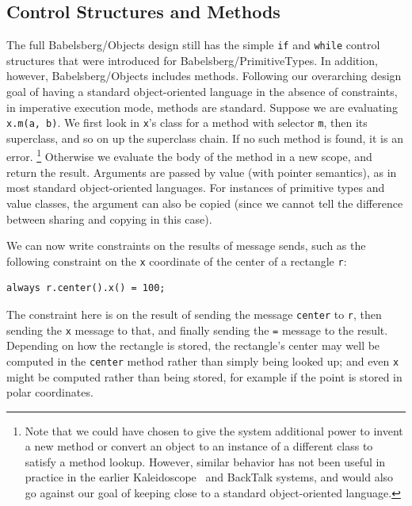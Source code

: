 \subsection{Control Structures and Methods}
\label{sec:contr-struct-meth}
The full Babelsberg/Objects design still has the simple \verb|if| and
\verb|while| control structures that were introduced for
Babelsberg/PrimitiveTypes. In addition, however, Babelsberg/Objects
includes methods. Following our overarching design goal of having a
standard object-oriented language in the absence of constraints, in
imperative execution mode, methods are standard.  Suppose we are
evaluating \verb|x.m(a, b)|.  We first look in \verb|x|'s class for a
method with selector \verb|m|, then its superclass, and so on up the
superclass chain. If no such method is found, it is an
error. \footnote{Note that we could have chosen to give the system
  additional power to invent a new method or convert an object to an
  instance of a different class to satisfy a method lookup. However,
  similar behavior has not been useful in practice in the earlier
  Kaleidoscope~\cite{freeman-benson-oopsla-1990} and BackTalk
 \cite{pachet1995} systems, and would also go against our goal of
  keeping close to a standard object-oriented language.} Otherwise we
evaluate the body of the method in a new scope, and return the result.
Arguments are passed by value (with pointer semantics), as in most
standard object-oriented languages.  For instances of primitive types
and value classes, the argument can also be copied (since we cannot
tell the difference between sharing and copying in this case).

We can now write constraints on the results of message sends, such as
the following constraint on the \verb!x! coordinate of the center of a
rectangle \verb!r!:
\begin{lstlisting}
always r.center().x() = 100;
\end{lstlisting}

The constraint here is on the result of sending the message
\verb|center| to \verb|r|, then sending the \verb|x| message to that,
and finally sending the \verb|=| message to the result.  Depending on
how the rectangle is stored, the rectangle's center may well be
computed in the \verb|center| method rather than simply being looked
up; and even \verb|x| might be computed rather than being stored, for
example if the point is stored in polar coordinates.

